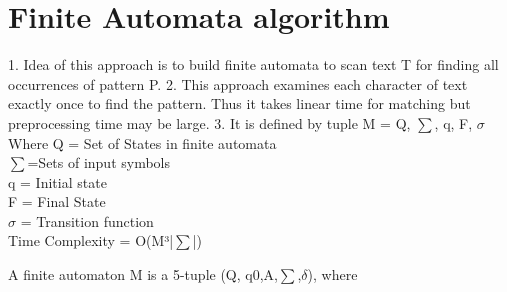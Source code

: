 \documentclass[11pt,a4paper]{article}
\begin{document}
\section{Finite Automata algorithm}
\label{sec:Finite Automata algorithm}
1. Idea of this approach is to build finite automata to scan text T for finding all occurrences of pattern P.
2. This approach examines each character of text exactly once to find the pattern. Thus it takes linear time for matching but preprocessing time may be large.
3. It is defined by tuple M = {Q, \begin{math}\sum\end{math}, q, F, \begin{math}\sigma\end{math}} 
\\
Where Q = Set of States in finite automata
\\
\begin{math}\sum\end{math}=Sets of input symbols
\\
q = Initial state
\\
F = Final State
\\
\begin{math}\sigma\end{math} = Transition function
\\
Time Complexity = O(M³|\begin{math}\sum\end{math}|)

A finite automaton M is a 5-tuple (Q, q0,A,\begin{math}\sum\end{math},\begin{math}\delta\end{math}), where
\end{document}
